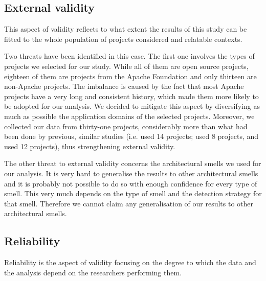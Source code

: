 
\subsection{External validity}
This aspect of validity reflects to what extent the results of this study can be fitted to the whole population of projects considered and relatable contexts.

Two threats have been identified in this case.
The first one involves the types of projects we selected for our study.
While all of them are open source projects, eighteen of them are projects from the Apache Foundation and only thirteen are non-Apache projects.
The imbalance is caused by the fact that most Apache projects have a very long and consistent history, which made them more likely to be adopted for our analysis.
We decided to mitigate this aspect by diversifying as much as possible the application domains of the selected projects.
Moreover, we collected our data from thirty-one projects, considerably more than what had been done by previous, similar studies (i.e. \cite{Le2015} used 14 projects; \cite{Le2018} used 8 projects, and \cite{Oyetoyan2015} used 12 projects), thus strengthening external validity.

The other threat to external validity concerns the architectural smells we used for our analysis.
It is very hard to generalise the results to other architectural smells and it is probably not possible to do so with enough confidence for every type of smell. This very much depends on the type of smell and the detection strategy for that smell. Therefore we cannot claim any generalisation of our results to other architectural smells.

\subsection{Reliability}
Reliability is the aspect of validity focusing on the degree to which the data and the analysis depend on the researchers performing them.

